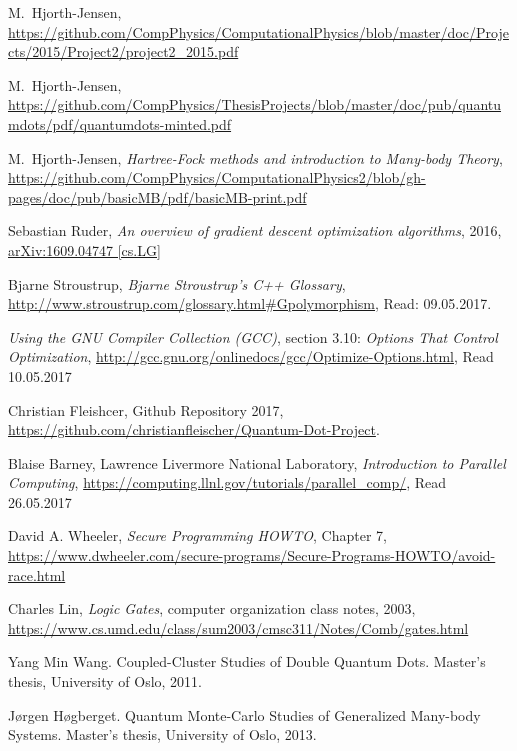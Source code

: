 \documentclass[../main.tex]{subfiles}
\begin{document}
\begin{thebibliography}{99}
 M.~Hjorth-Jensen, \url{https://github.com/CompPhysics/ComputationalPhysics/blob/master/doc/Projects/2015/Project2/project2_2015.pdf}

 M.~Hjorth-Jensen, \url{https://github.com/CompPhysics/ThesisProjects/blob/master/doc/pub/quantumdots/pdf/quantumdots-minted.pdf}

 M.~Hjorth-Jensen, \emph{Hartree-Fock methods and introduction to Many-body Theory}, \url{https://github.com/CompPhysics/ComputationalPhysics2/blob/gh-pages/doc/pub/basicMB/pdf/basicMB-print.pdf}

 Sebastian Ruder, \emph{An overview of gradient descent optimization
algorithms}, 2016, 	\href{https://arxiv.org/abs/1609.04747}{arXiv:1609.04747 [cs.LG]}


 Bjarne Stroustrup, \emph{Bjarne Stroustrup's C++ Glossary},  \url{http://www.stroustrup.com/glossary.html#Gpolymorphism}, Read: 09.05.2017.

 \emph{Using the GNU Compiler Collection (GCC)}, section 3.10: \emph{Options That Control Optimization}, \url{http://gcc.gnu.org/onlinedocs/gcc/Optimize-Options.html}, Read 10.05.2017

 Christian Fleishcer, Github Repository 2017,  \url{https://github.com/christianfleischer/Quantum-Dot-Project}.

 Blaise Barney, Lawrence Livermore National Laboratory, \emph{Introduction to Parallel Computing}, \url{https://computing.llnl.gov/tutorials/parallel_comp/}, Read 26.05.2017

 David A. Wheeler, \emph{Secure Programming HOWTO}, Chapter 7,  \url{https://www.dwheeler.com/secure-programs/Secure-Programs-HOWTO/avoid-race.html}%

 Charles Lin, \emph{Logic Gates}, computer organization class notes, 2003, \url{https://www.cs.umd.edu/class/sum2003/cmsc311/Notes/Comb/gates.html} %

 Yang Min Wang. Coupled-Cluster Studies of Double Quantum
Dots. Master’s thesis, University of Oslo, 2011.

 Jørgen Høgberget. Quantum Monte-Carlo Studies of Generalized Many-body Systems. 
Master’s thesis, University of Oslo, 2013.


\end{thebibliography}
\end{document}
